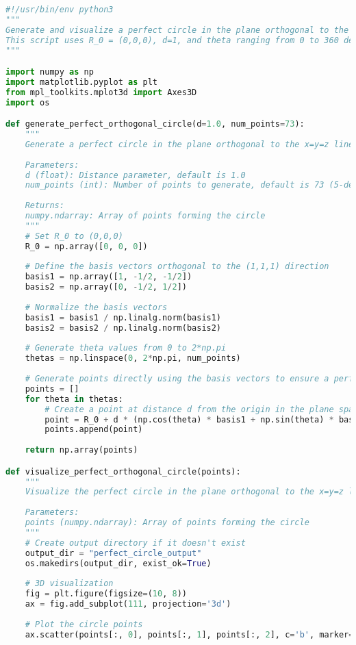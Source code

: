 \begin{lstlisting}[language=Python]
#!/usr/bin/env python3
"""
Generate and visualize a perfect circle in the plane orthogonal to the x=y=z line.
This script uses R_0 = (0,0,0), d=1, and theta ranging from 0 to 360 degrees in 5-degree steps.
"""

import numpy as np
import matplotlib.pyplot as plt
from mpl_toolkits.mplot3d import Axes3D
import os

def generate_perfect_orthogonal_circle(d=1.0, num_points=73):
    """
    Generate a perfect circle in the plane orthogonal to the x=y=z line.
    
    Parameters:
    d (float): Distance parameter, default is 1.0
    num_points (int): Number of points to generate, default is 73 (5-degree steps)
    
    Returns:
    numpy.ndarray: Array of points forming the circle
    """
    # Set R_0 to (0,0,0)
    R_0 = np.array([0, 0, 0])
    
    # Define the basis vectors orthogonal to the (1,1,1) direction
    basis1 = np.array([1, -1/2, -1/2])
    basis2 = np.array([0, -1/2, 1/2])
    
    # Normalize the basis vectors
    basis1 = basis1 / np.linalg.norm(basis1)
    basis2 = basis2 / np.linalg.norm(basis2)
    
    # Generate theta values from 0 to 2*np.pi
    thetas = np.linspace(0, 2*np.pi, num_points)
    
    # Generate points directly using the basis vectors to ensure a perfect circle
    points = []
    for theta in thetas:
        # Create a point at distance d from the origin in the plane spanned by basis1 and basis2
        point = R_0 + d * (np.cos(theta) * basis1 + np.sin(theta) * basis2)
        points.append(point)
    
    return np.array(points)

def visualize_perfect_orthogonal_circle(points):
    """
    Visualize the perfect circle in the plane orthogonal to the x=y=z line.
    
    Parameters:
    points (numpy.ndarray): Array of points forming the circle
    """
    # Create output directory if it doesn't exist
    output_dir = "perfect_circle_output"
    os.makedirs(output_dir, exist_ok=True)
    
    # 3D visualization
    fig = plt.figure(figsize=(10, 8))
    ax = fig.add_subplot(111, projection='3d')
    
    # Plot the circle points
    ax.scatter(points[:, 0], points[:, 1], points[:, 2], c='b', marker='o')
    

\end{lstlisting}
